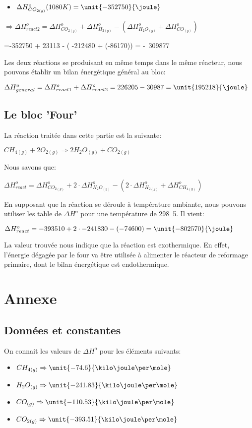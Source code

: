 \documentclass[11pt,a4paper]{report}
\begin{document}
\begin{itemize}
\item{$\Delta H^o_{CO_{2(g)}} (1080K)= \unit{-352750}{\joule}$}
\end{itemize}
$\Rightarrow \Delta H^o_{react2}= \Delta H^o_{CO_{2(g)}} + \Delta H^o_{H_{2(g)}} -(\Delta H^o_{H_{2}O_{(g)}} + \Delta H^o_{CO_{(g)}})$

=-352750 + 23113 - ( -212480 + (-86170)) = \unit{-30987}{\joule}7

Les deux réactions se produisant en même temps dans le même réacteur, nous pouvons établir un bilan énergétique général au bloc:


$\Delta H^o_{general}= \Delta H^o_{react1} + \Delta H^o_{react2} = 226205 - 30987 = \unit{195218}{\joule}$

\subsection*{Le bloc 'Four'}
La réaction traitée dans cette partie est la suivante:

$CH_{4(g)} + 2O_{2(g)} \Rightarrow 2H_{2}O_{(g)} + CO_{2(g)}$

Nous savons que:

$\Delta H^o_{react} = \Delta H^o_{CO_{2(g)}} + 2\cdot \Delta H^o_{H_{2}O_{(g)}} - (2\cdot \Delta H^o_{H_{2(g)}} + \Delta H^o_{CH_{4(g)}}) $

En supposant que la réaction se déroule à température ambiante, nous pouvons utiliser les table de $\Delta H^o$ pour une température de \unit{298.5}{\kelvin}. Il vient:

$\Delta H^o_{react} = -393510 + 2\cdot -241830 - (-74600) = \unit{-802570}{\joule}$

La valeur trouvée nous indique que la réaction est exothermique. En effet, l'énergie dégagée par le four va être utilisée à alimenter le réacteur de reformage primaire, dont le bilan énergétique est endothermique.
\section*{Annexe}
\subsection*{Données et constantes}
On connait les valeurs de $\Delta H^o$ pour les éléments suivants:
\begin{itemize}
\item{$CH_{4(g)} \Rightarrow \unit{-74.6}{\kilo\joule\per\mole}$}
\item{$H_2O_{(g)} \Rightarrow \unit{-241.83}{\kilo\joule\per\mole}$}
\item{$CO_{(g)} \Rightarrow \unit{-110.53}{\kilo\joule\per\mole}$}
\item{$CO_{2(g)} \Rightarrow \unit{-393.51}{\kilo\joule\per\mole}$}
\end{itemize}
\end{document}
